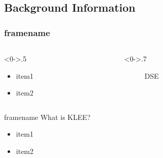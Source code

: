 \documentclass[9pt,aspectratio=43,mathserif,table]{beamer}
\begin{document}
\subsection{Background Information}
\begin{frame}
  \frametitle<presentation>{framename}
  \begin{columns}[T] %
    \begin{column}<0->{.5\textwidth}
      \begin{itemize}
        \item item1
        \item item2
      \end{itemize}
    \end{column}%
    \hfill%
    \begin{column}<0->{.7\textwidth}
      \begin{figure}[thpb]
        \centering
        \caption{DSE}
        \label{fig:dse}
      \end{figure}
    \end{column}%
  \end{columns}
\end{frame}

\begin{frame}{framename}
  What is KLEE?
  \begin{itemize}
    \item<0-> item1
    \item<0-> item2
  \end{itemize}
\end{frame}
\end{document}
